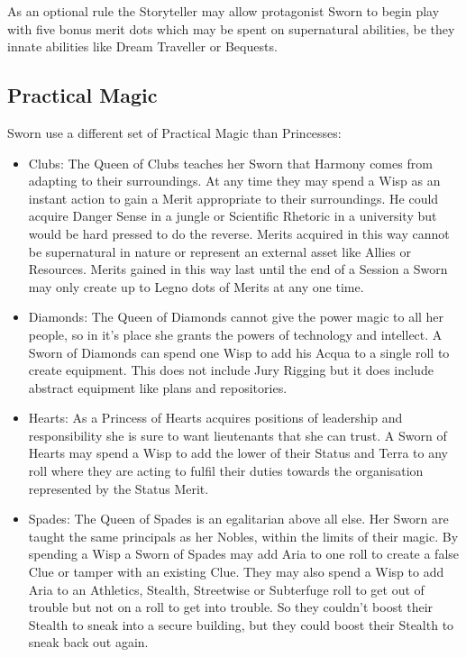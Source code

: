 As an optional rule the Storyteller may allow protagonist Sworn to begin play with five bonus merit dots which may be spent on supernatural abilities, be they innate abilities like Dream Traveller or Bequests.

\subsection*{Practical Magic}

Sworn use a different set of Practical Magic than Princesses: 

\begin{itemize}
\item Clubs: The Queen of Clubs teaches her Sworn that Harmony comes from adapting to their surroundings. At any time they may spend a Wisp as an instant action to gain a Merit appropriate to their surroundings. He could acquire Danger Sense in a jungle or Scientific Rhetoric in a university but would be hard pressed to do the reverse. Merits acquired in this way cannot be supernatural in nature or represent an external asset like Allies or Resources. Merits gained in this way last until the end of a Session a Sworn may only create up to Legno dots of Merits at any one time. 
\item Diamonds: The Queen of Diamonds cannot give the power magic to all her people, so in it's place she grants the powers of technology and intellect. A Sworn of Diamonds can spend one Wisp to add his Acqua to a single roll to create equipment. This does not include Jury Rigging but it does include abstract equipment like plans and repositories.
\item Hearts: As a Princess of Hearts acquires positions of leadership and responsibility she is sure to want lieutenants that she can trust. A Sworn of Hearts may spend a Wisp to add the lower of their Status and Terra to any roll where they are acting to fulfil their duties towards the organisation represented by the Status Merit. 
\item Spades: The Queen of Spades is an egalitarian above all else. Her Sworn are taught the same principals as her Nobles, within the limits of their magic. By spending a Wisp a Sworn of Spades may add Aria to one roll to create a false Clue or tamper with an existing Clue. They may also spend a Wisp to add Aria to an Athletics, Stealth, Streetwise or Subterfuge roll to get out of trouble but not on a roll to get into trouble. So they couldn't boost their Stealth to sneak into a secure building, but they could boost their Stealth to sneak back out again. 

\end{itemize}
